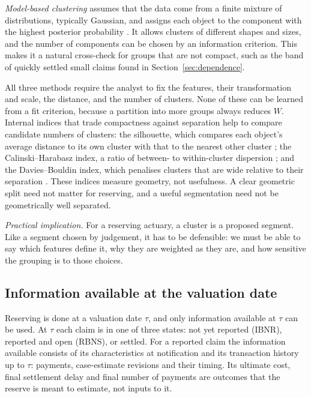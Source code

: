 \emph{Model-based clustering} assumes that the data come from a finite mixture of distributions, typically Gaussian, and assigns each object to the component with the highest posterior probability \parencite{mclachlan2000finite}. It allows clusters of different shapes and sizes, and the number of components can be chosen by an information criterion. This makes it a natural cross-check for groups that are not compact, such as the band of quickly settled small claims found in Section~\ref{sec:dependence}.

All three methods require the analyst to fix the features, their transformation and scale, the distance, and the number of clusters. None of these can be learned from a fit criterion, because a partition into more groups always reduces $W$. Internal indices that trade compactness against separation help to compare candidate numbers of clusters: the silhouette, which compares each object's average distance to its own cluster with that to the nearest other cluster \parencite{rousseeuw1987silhouettes}; the Calinski--Harabasz index, a ratio of between- to within-cluster dispersion \parencite{calinski1974dendrite}; and the Davies--Bouldin index, which penalises clusters that are wide relative to their separation \parencite{davies1979cluster}. These indices measure geometry, not usefulness. A clear geometric split need not matter for reserving, and a useful segmentation need not be geometrically well separated.

\emph{Practical implication.} For a reserving actuary, a cluster is a proposed segment. Like a segment chosen by judgement, it has to be defensible: we must be able to say which features define it, why they are weighted as they are, and how sensitive the grouping is to those choices.

\subsection{Information available at the valuation date}
\label{sec:information}

Reserving is done at a valuation date $\tau$, and only information available at $\tau$ can be used. At $\tau$ each claim is in one of three states: not yet reported (IBNR), reported and open (RBNS), or settled. For a reported claim the information available consists of its characteristics at notification and its transaction history up to $\tau$: payments, case-estimate revisions and their timing. Its ultimate cost, final settlement delay and final number of payments are outcomes that the reserve is meant to estimate, not inputs to it.

